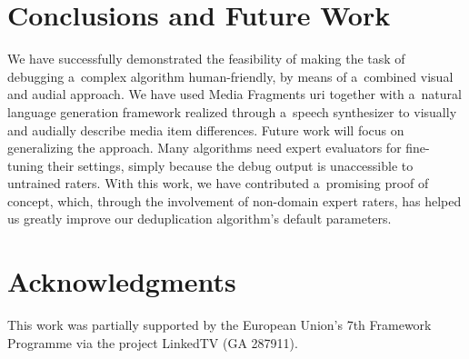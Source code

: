 \documentclass{article}
\begin{document}

\section{Conclusions and Future Work}
\label{sec:conclusions-and-future-work}
We have successfully demonstrated the feasibility of making the task of debugging a~complex algorithm human-friendly, by means of a~combined visual and audial approach. We have used Media Fragments {\sc uri} together with a~natural language generation framework realized through a~speech synthesizer to visually and audially describe media item differences. Future work will focus on generalizing the approach. Many algorithms need expert evaluators for fine-tuning their settings, simply because the debug output is unaccessible to untrained raters. With this work, we have contributed a~promising proof of concept, which, through the involvement of non-domain expert raters, has helped us greatly improve our deduplication algorithm's default parameters.


\section{Acknowledgments}
This work was partially supported by the European Union's 7th Framework Programme via the project LinkedTV (GA 287911).


\begin{spacing}{0.934}


\end{spacing}
\end{document}
